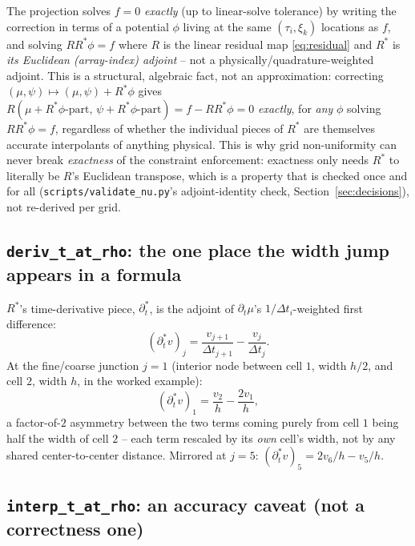 \documentclass[11pt]{article}
\newcommand{\h}{h}
\newcommand{\code}[1]{\texttt{#1}}
\begin{document}
The projection solves $f=0$ \emph{exactly} (up to linear-solve tolerance) by writing the
correction in terms of a potential $\phi$ living at the same $(\tau_i,\xi_k)$ locations
as $f$, and solving $R R^{*}\phi = f$ where $R$ is the linear residual map
\eqref{eq:residual} and $R^{*}$ is \emph{its Euclidean (array-index) adjoint} -- not a
physically/quadrature-weighted adjoint. This is a structural, algebraic fact, not an
approximation: correcting $(\mu,\psi)\mapsto(\mu,\psi) + R^{*}\phi$ gives
$R(\mu+R^*\phi\text{-part},\,\psi+R^*\phi\text{-part}) = f - RR^*\phi = 0$ \emph{exactly},
for \emph{any} $\phi$ solving $RR^*\phi=f$, regardless of whether the individual pieces
of $R^*$ are themselves accurate interpolants of anything physical. This is why grid
non-uniformity can never break \emph{exactness} of the constraint enforcement: exactness
only needs $R^*$ to literally be $R$'s Euclidean transpose, which is a property that is
checked once and for all (\code{scripts/validate\_nu.py}'s adjoint-identity check,
Section~\ref{sec:decisions}), not re-derived per grid.

\subsection{\code{deriv\_t\_at\_rho}: the one place the width jump appears in a formula}

$R^{*}$'s time-derivative piece, $\partial_t^{*}$, is the adjoint of $\partial_t\mu$'s
$1/\Delta t_i$-weighted first difference:
\begin{equation}
  (\partial_t^{*}v)_j = \frac{v_{j+1}}{\Delta t_{j+1}} - \frac{v_j}{\Delta t_j}.
\end{equation}
At the fine/coarse junction $j=1$ (interior node between cell $1$, width $\h/2$, and cell
$2$, width $\h$, in the worked example):
\begin{equation}
  (\partial_t^{*}v)_1 = \frac{v_2}{\h} - \frac{2v_1}{\h},
\end{equation}
a factor-of-$2$ asymmetry between the two terms coming purely from cell $1$ being half
the width of cell $2$ -- each term rescaled by its \emph{own} cell's width, not by any
shared center-to-center distance. Mirrored at $j=5$: $(\partial_t^{*}v)_5 = 2v_6/\h -
v_5/\h$.

\subsection{\code{interp\_t\_at\_rho}: an accuracy caveat (not a correctness one)}
\end{document}
